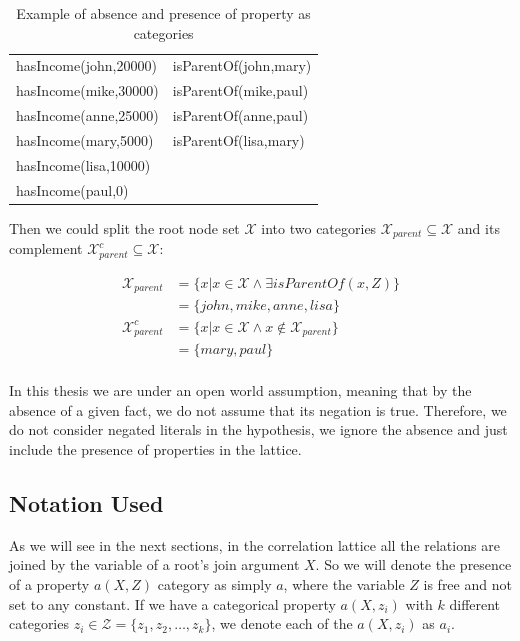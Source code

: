 \begin{table}[h!]
 \label{tab:cat3}
 \begin{center}
 \caption{Example of absence and presence of property as categories}
  \begin{tabular}{l l}
    \toprule
    hasIncome(john,20000) & isParentOf(john,mary) \\
    hasIncome(mike,30000) & isParentOf(mike,paul) \\
    hasIncome(anne,25000) & isParentOf(anne,paul) \\
    hasIncome(mary,5000)  & isParentOf(lisa,mary) \\
    hasIncome(lisa,10000) & 			\\
    hasIncome(paul,0)	  & 			\\
    \bottomrule
  \end{tabular}
 \end{center}
\end{table}

Then we could split the root node set $\mathcal{X}$ into two categories $\mathcal{X}_{parent} \subseteq \mathcal{X}$
and its complement $\mathcal{X}_{parent}^{c} \subseteq \mathcal{X}$:

\begin{align*}
 \mathcal{X}_{parent}&=\{x| x \in \mathcal{X} \land \exists isParentOf(x,Z)\} \\
  &=\{john,mike,anne,lisa\} \\
 \mathcal{X}_{parent}^{c}&=\{x| x \in \mathcal{X} \land x \not \in \mathcal{X}_{parent} \} \\
  &=\{mary,paul\} \\
\end{align*}

In this thesis we are under an open world assumption, meaning that by the absence of a given fact, we do
not assume that its negation is true. Therefore, we do not consider negated literals in the hypothesis, we
ignore the absence and just include the presence of properties in the lattice.

\subsection{Notation Used}

As we will see in the next sections, in the correlation lattice all the relations are joined by the variable of
a root's join argument $X$. So we will denote the presence of a property $a(X,Z)$ category as simply $a$, where the
variable $Z$ is free and not set to any constant. If we have a categorical property $a(X,z_i)$ with $k$ different
categories $z_i \in \mathcal{Z}=\{ z_1,z_2,\ldots,z_k\}$, we denote each of the $a(X,z_i)$ as $a_i$.

